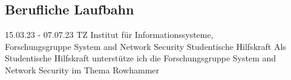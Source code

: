 \documentclass[
	10pt, %
]{FreemanCV}
\begin{document}
\begin{paracol}{2}
%
%


\section{Berufliche Laufbahn}





\jobentry
{15.03.23 - 07.07.23} %
{TZ} %
{Institut für Informationssysteme, \\ Forschungsgruppe System and Network Security \newline} %
{Studentische Hilfskraft} %
{Als Studentische Hilfskraft unterstütze ich die Forschungsgruppe \newline System and Network Security im Thema
	Rowhammer} %







\end{paracol}
\end{document}
